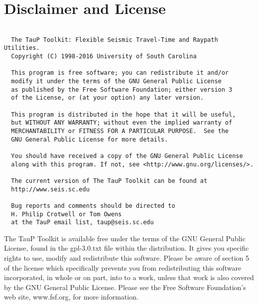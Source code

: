
\section*{Disclaimer and License}
\begin{verbatim}

  The TauP Toolkit: Flexible Seismic Travel-Time and Raypath Utilities.
  Copyright (C) 1998-2016 University of South Carolina

  This program is free software; you can redistribute it and/or
  modify it under the terms of the GNU General Public License
  as published by the Free Software Foundation; either version 3
  of the License, or (at your option) any later version.

  This program is distributed in the hope that it will be useful,
  but WITHOUT ANY WARRANTY; without even the implied warranty of
  MERCHANTABILITY or FITNESS FOR A PARTICULAR PURPOSE.  See the
  GNU General Public License for more details.

  You should have received a copy of the GNU General Public License
  along with this program. If not, see <http://www.gnu.org/licenses/>.

  The current version of The TauP Toolkit can be found at
  http://www.seis.sc.edu

  Bug reports and comments should be directed to
  H. Philip Crotwell or Tom Owens
  at the TauP email list, taup@seis.sc.edu

\end{verbatim}

The TauP Toolkit is available free under the terms of the GNU General Public
License, found in the gpl-3.0.txt file within the distribution. It gives you
specific rights to use, modify and redistribute this software. Please be
aware of section 5 of the license which specifically prevents you from
redistributing this software incorporated, in whole
or on part, into to a work, unless that work is also covered by the
GNU General Public License. Please see the Free Software Foundation's
web site, www.fsf.org, for more information.
